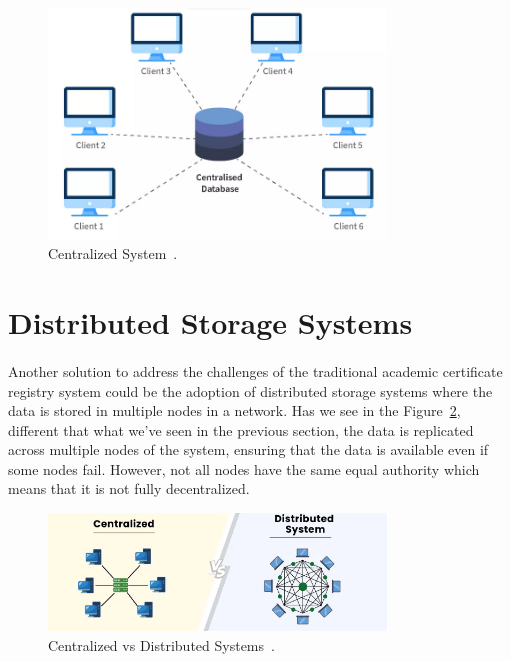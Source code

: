 \begin{figure}[H]\label{fig:centralized-system}
    \begin{center}
        \includegraphics[width=0.8\textwidth]{assets/centralized-database.png}
        \caption{Centralized System~\cite{centralizedDB}.}
    \end{center}
\end{figure}

\section{Distributed Storage Systems}\label{subsec:distributed-systems}
\paragraph{}

Another solution to address the challenges of the traditional academic certificate registry system could be the adoption of distributed storage systems where the data is stored in multiple nodes in a network.
Has we see in the Figure~\ref{fig:distributed-system}, different that what we've seen in the previous section, the data is replicated across multiple nodes of the system, ensuring that the data is available even if some nodes fail. However, not all nodes have the same equal authority which means that
it is not fully decentralized.

\vspace{.25cm}
\begin{figure}[h]\label{fig:distributed-system}
    \begin{center}
        \includegraphics[width=0.8\textwidth]{assets/centralized-vs-distributed.png}
        \caption{Centralized vs Distributed Systems~\cite{centralizedVsDistributed}.}
    \end{center}
\end{figure}

